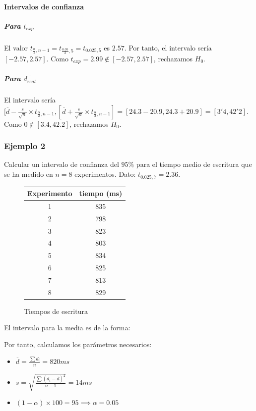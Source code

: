 \documentclass[12pt,spanish]{article}
\begin{document}
\paragraph{Intervalos de confianza}

\subparagraph{Para $t_{exp}$}

El valor $t_{\frac{\alpha}{2},n-1}=t_{\frac{0.05}{2},5}=t_{0.025,5}$ es $2.57$. Por tanto, el intervalo sería $[-2.57,2.57]$. Como $t_{exp}=2.99 \not \in [-2.57,2.57]$, rechazamos $H_0$.

\subparagraph{Para $\overline{d_{real}}$}

El intervalo sería $[\overline{d}-\frac{s}{\sqrt{n}} \times t_{\frac{\alpha}{2},n-1}, [\overline{d}+\frac{s}{\sqrt{n}} \times t_{\frac{\alpha}{2},n-1}]= [24.3 - 20.9, 24.3 + 20.9] = [3'4, 42'2]$. Como $0 \not \in [3.4, 42.2]$, rechazamos $H_0$.

\subsubsection{Ejemplo 2}
Calcular un intervalo de confianza del $95\%$ para el tiempo medio de escritura que se ha medido en $n=8$ experimentos. Dato: $t_{0.025,7}=2.36$.
\begin{figure}[H]
	\centering
	\begin{tabular}{|c|c|}
		\hline
		Experimento & tiempo (ms)\\
		\hline
		1 & 835 \\
		\hline
		2 & 798 \\
		\hline
		3 & 823\\
		\hline
		4 & 803\\
		\hline
		5 & 834\\
		\hline
		6 & 825\\
		\hline
		7 & 813\\
		\hline
		8 & 829\\
		\hline
	\end{tabular}
	\caption{Tiempos de escritura}
\end{figure}

El intervalo para la media es de la forma:
\begin{equation*}
	[\overline{d}-\frac{s}{\sqrt{n}} \times t_{\frac{\alpha}{2},n-1}, [\overline{d}+\frac{s}{\sqrt{n}} \times t_{\frac{\alpha}{2},n-1}]
\end{equation*}

Por tanto, calculamos los parámetros necesarios:
\begin{itemize}
	\item $\overline{d}=\frac{\sum{d_i}}{n}=820ms$
	\item $s=\sqrt{\frac{\sum{(d_i-\overline{d})^2}}{n-1}}=14ms$
	\item $(1-\alpha) \times 100 = 95 \implies \alpha=0.05$
\end{itemize}
\end{document}
